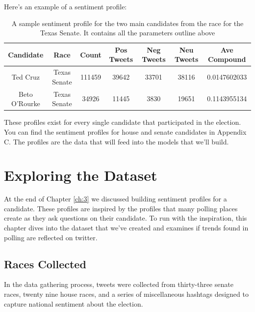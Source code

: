 \documentclass[11pt, twoside, reqno]{book}
\begin{document}
Here's an example of a sentiment profile:
\begin{table}[H]
\centering
\begin{tabular}{ |c|c|c|c|c|c|c|}
	\hline
	Candidate & Race & Count & Pos Tweets & Neg Tweets & Neu Tweets & Ave Compound\\
 	\hline 
	Ted Cruz & Texas Senate & 111459 & 39642 & 33701 & 38116 & 0.0147602033 \\
  	\hline
	Beto O'Rourke & Texas Senate & 34926 & 11445 & 3830 & 19651 & 0.1143955134 \\ 
	\hline
\end{tabular}
\caption{A sample sentiment profile for the two main candidates from the race for the Texas Senate. It contains all the parameters outline above}\label{fig:sample_profile}
\end{table}
These profiles exist for every single candidate that participated in the election. You can find the sentiment profiles for house and senate candidates in Appendix C. The profiles are the data that will feed into the models that we'll build. 



\chapter{Exploring the Dataset}
\label{ch:4}

\hspace{0.2in}At the end of Chapter \ref{ch:3} we discussed building sentiment profiles for a candidate. These profiles are inspired by the profiles that many polling places create as they ask questions on their candidate. To run with the inspiration, this chapter dives into the dataset that we've created and examines if trends found in polling are reflected on twitter.  

\section{Races Collected}
\hspace{0.2in}In the data gathering process, tweets were collected from thirty-three senate races, twenty nine house races, and a series of miscellaneous hashtags designed to capture national sentiment about the election. 
\end{document}
